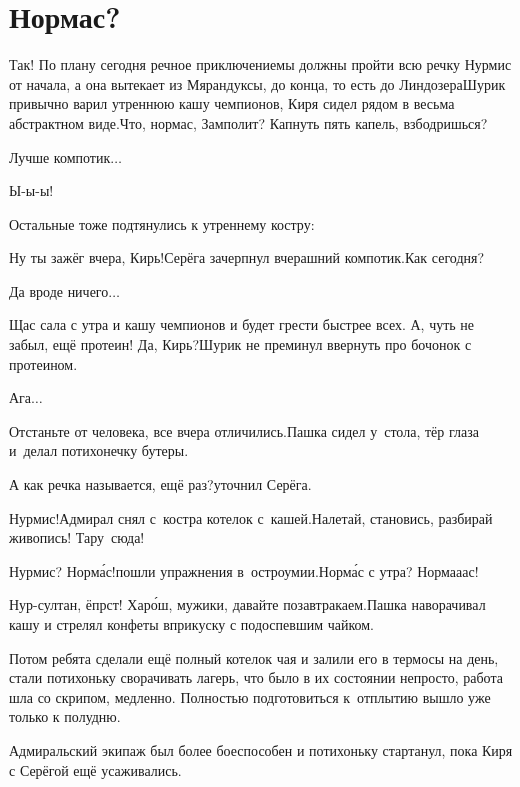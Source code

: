 \chapter{Нормас?}
\vepsianrose

\diagdash Так! По плану сегодня речное приключение\mdash мы должны пройти всю речку Нурмис от начала, а она вытекает из Мярандуксы, до конца, то есть до Линдозера\mdash Шурик привычно варил утреннюю кашу чемпионов, Киря сидел рядом в весьма абстрактном виде.\mdash Что, нормас, Замполит? Капнуть пять капель, взбодришься?

\diagdash Лучше компотик$\ldots$

\diagdash Ы-ы-ы!%

Остальные тоже подтянулись к утреннему костру:

\diagdash Ну ты зажёг вчера, Кирь!\mdash Серёга зачерпнул вчерашний компотик.\mdash Как сегодня?

\diagdash Да вроде ничего$\ldots$

\diagdash Щас сала с утра и кашу чемпионов и будет грести быстрее всех. А, чуть не забыл, ещё протеин! Да, Кирь?\mdash Шурик не преминул ввернуть про бочонок с протеином.

\diagdash Ага$\ldots$

\diagdash Отстаньте от человека, все вчера отличились.\mdash Пашка сидел у~стола, тёр глаза и~делал потихонечку бутеры.

\diagdash А как речка называется, ещё раз?\mdash уточнил Серёга.

\diagdash Нурмис!\mdash Адмирал снял с~костра котелок с~кашей.\mdash Налетай, становись, разбирай живопись! Тару~сюда!

\diagdash Нурмис? Норм{\'а}с!\mdash пошли упражнения в~остроумии.\mdash Норм{\'а}с с утра?  Норма\sdash а\sdash ас!

\diagdash Нур-султан, ёпрст! Хар{\'о}ш, мужики, давайте позавтракаем.\mdash Пашка наворачивал кашу и стрелял конфеты вприкуску с подоспевшим чайком.

Потом ребята сделали ещё полный котелок чая и залили его в термосы на день, стали потихоньку сворачивать лагерь, что было в их состоянии непросто, работа шла со скрипом, медленно. Полностью подготовиться к~отплытию вышло уже только к полудню.

Адмиральский экипаж был более боеспособен и потихоньку стартанул, пока Киря с Серёгой ещё усаживались. 

